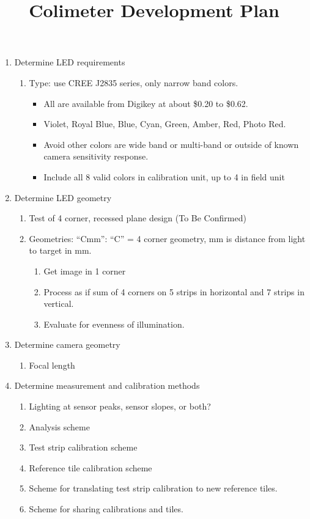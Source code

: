 \documentclass{article}
\title{Colimeter Development Plan}
\author{}
\date{}
\begin{document}
\maketitle

\begin{enumerate}[label=\arabic*.]

\item Determine LED requirements
\begin{enumerate}[label=\alph*)]
    \item Type: use CREE J2835 series, only narrow band colors.
    \begin{itemize}
        \item All are available from Digikey at about \$0.20 to \$0.62.
        \item Violet, Royal Blue, Blue, Cyan, Green, Amber, Red, Photo Red.
        \item Avoid other colors are wide band or multi-band or outside of known camera sensitivity response.
        \item Include all 8 valid colors in calibration unit, up to 4 in field unit
    \end{itemize}
\end{enumerate}

\item Determine LED geometry
\begin{enumerate}[label=\alph*)]
    \item Test of 4 corner, recessed plane design (To Be Confirmed)
    \item Geometries: ``Cmm'': ``C'' = 4 corner geometry, mm is distance from light to target in mm.
    \begin{enumerate}[label=\roman*)]
        \item Get image in 1 corner
        \item Process as if sum of 4 corners on 5 strips in horizontal and 7 strips in vertical.
        \item Evaluate for evenness of illumination.
    \end{enumerate}
\end{enumerate}

\item Determine camera geometry
\begin{enumerate}[label=\alph*)]
    \item Focal length
\end{enumerate}

\item Determine measurement and calibration methods
\begin{enumerate}[label=\alph*)]
    \item Lighting at sensor peaks, sensor slopes, or both?
    \item Analysis scheme
    \item Test strip calibration scheme
    \item Reference tile calibration scheme
    \item Scheme for translating test strip calibration to new reference tiles.
    \item Scheme for sharing calibrations and tiles.
\end{enumerate}


\end{enumerate}
\end{document}
